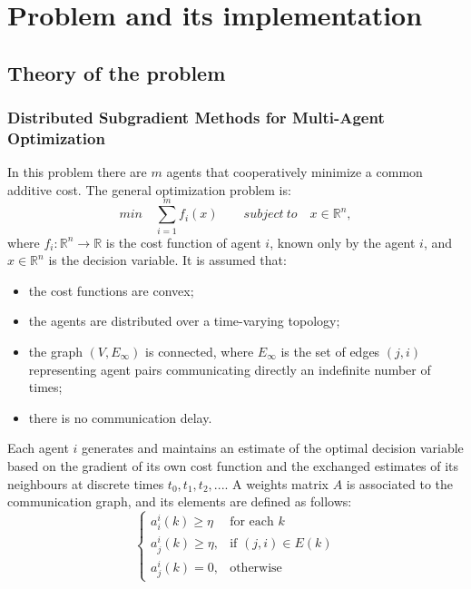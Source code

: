 \documentclass[a4paper,11pt,oneside]{book}
\begin{document}


\chapter{Problem and its implementation} \label{Cap1}

\section{Theory of the problem} \label{Sec1.1}
\subsection {Distributed Subgradient Methods for Multi-Agent Optimization} \label{Subsec1.1.1}
In this problem there are $m$ agents that cooperatively minimize a common additive cost. The general optimization problem is:\\
\begin{equation} \label{costfunct}
min \quad \sum\limits_{i=1}^{m} f_{i} \left( x \right) \qquad subject \ to \quad x \in \mathbb{R}^n,
\end{equation}
where $f_i : \mathbb{R}^n \longrightarrow \mathbb{R}$ is the cost function of agent $i$, known only by the agent $i$, and $x \in \mathbb{R}^n$ is the decision variable. It is assumed that:
\begin{itemize} 
\item the cost functions are convex;
\item the agents are distributed over a time-varying topology;
\item the graph $\left(V,E_\infty\right)$ is connected, where $E_\infty$ is the set of edges $\left(j,i\right)$ representing agent pairs communicating directly an indefinite number of times;
\item there is no communication delay.
\end{itemize} 
Each agent $i$ generates and maintains an estimate of the optimal decision variable based on the gradient of its own cost function and the exchanged estimates of its neighbours at discrete times $t_0, t_1, t_2, ...$. A weights matrix $A$ is associated to the communication graph, and its elements are defined as follows:
\[
	\begin{cases}
		a^i_i(k) \ge \eta & \text{for each } k \\
		a^i_j(k) \ge \eta, & \text{if } (j,i) \in E(k) \\
		a^i_j(k) = 0, & \text{otherwise}
	\end{cases}
\]
\end{document}
